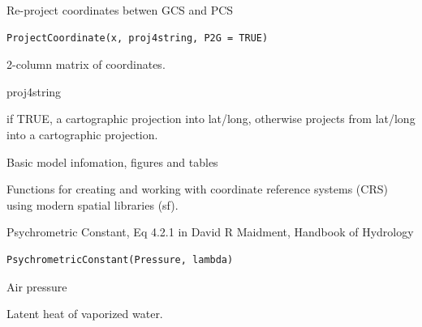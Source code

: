 \documentclass[a4paper]{book}
\begin{document}
%
\begin{Description}\relax
Re-project coordinates betwen GCS and PCS
\end{Description}
%
\begin{Usage}
\begin{verbatim}
ProjectCoordinate(x, proj4string, P2G = TRUE)
\end{verbatim}
\end{Usage}
%
\begin{Arguments}
\begin{ldescription}
\item[\code{x}] 2-column matrix of coordinates.

\item[\code{proj4string}] proj4string

\item[\code{P2G}] if TRUE, a cartographic projection into lat/long, otherwise projects from lat/long into a cartographic projection.
\end{ldescription}
\end{Arguments}
%
\begin{Value}
Basic model infomation, figures and tables
\end{Value}
%
\begin{Description}\relax
Functions for creating and working with coordinate reference systems (CRS)
using modern spatial libraries (sf).
\end{Description}
%
\begin{Description}\relax
Psychrometric Constant, Eq 4.2.1 in David R Maidment, Handbook of Hydrology
\end{Description}
%
\begin{Usage}
\begin{verbatim}
PsychrometricConstant(Pressure, lambda)
\end{verbatim}
\end{Usage}
%
\begin{Arguments}
\begin{ldescription}
\item[\code{Pressure}] Air pressure 

\item[\code{lambda}] Latent heat of vaporized water. 
\end{ldescription}
\end{Arguments}
\end{document}
